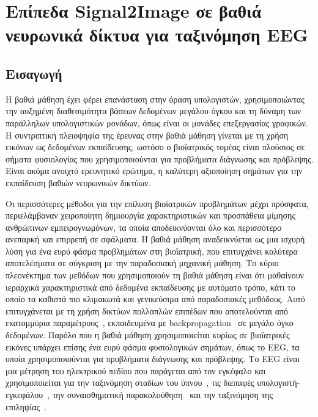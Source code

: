 \chapter{Επίπεδα Signal2Image σε βαθιά νευρωνικά δίκτυα για ταξινόμηση EEG}
\label{chapter5}
\graphicspath{{./images/signal2image-modules-in-deep-neural-networkds-for-eeg-classification/}}

\section{Εισαγωγή}
Η βαθιά μάθηση έχει φέρει επανάσταση στην όραση υπολογιστών, χρησιμοποιώντας την αυξημένη διαθεσιμότητα βάσεων δεδομένων μεγάλου όγκου και τη δύναμη των παράλληλων υπολογιστικών μονάδων, όπως είναι οι μονάδες επεξεργασίας γραφικών.
Η συντριπτική πλειοψηφία της έρευνας στην βαθιά μάθηση γίνεται με τη χρήση εικόνων ως δεδομένων εκπαίδευσης, ωστόσο ο βιοϊατρικός τομέας είναι πλούσιος σε σήματα φυσιολογίας που χρησιμοποιούνται για προβλήματα διάγνωσης και πρόβλεψης.
Είναι ακόμα ανοιχτό ερευνητικό ερώτημα, η καλύτερη αξιοποίηση σημάτων για την εκπαίδευση βαθιών νευρωνικών δικτύων.

Οι περισσότερες μέθοδοι για την επίλυση βιοϊατρικών προβλημάτων μέχρι πρόσφατα, περιελάμβαναν χειροποίητη δημιουργία χαρακτηριστικών και προσπάθεια μίμησης ανθρώπινων εμπειρογνωμόνων, τα οποία αποδεικνύονται όλο και περισσότερο ανεπαρκή και επιρρεπή σε σφάλματα.
Η βαθιά μάθηση αναδεικνύεται ως μια ισχυρή λύση για ένα ευρύ φάσμα προβλημάτων στη βιοϊατρική, που επιτυγχάνει καλύτερα αποτελέσματα σε σύγκριση με την παραδοσιακή μηχανική μάθηση.
Το κύριο πλεονέκτημα των μεθόδων που χρησιμοποιούν τη βαθιά μάθηση είναι ότι μαθαίνουν ιεραρχικά χαρακτηριστικά από δεδομένα εκπαίδευσης με αυτόματο τρόπο, κάτι το οποίο τα καθιστά πιο κλιμακωτά και γενικεύσιμα από παραδοσιακές μεθόδους.
Αυτό επιτυγχάνεται με τη χρήση δικτύων πολλαπλών επιπέδων που αποτελούνται από εκατομμύρια παραμέτρους~\cite{krizhevsky2012imagenet}, εκπαιδευμένα με backpropagation~\cite{rumelhart1986learning} σε μεγάλο όγκο δεδομένων.
Παρόλο που η βαθιά μάθηση χρησιμοποιείται κυρίως σε βιοϊατρικές εικόνες υπάρχει επίσης ένα ευρύ φάσμα φυσιολογικών σημάτων, όπως το EEG, τα οποία χρησιμοποιούνται για προβλήματα διάγνωσης και πρόβλεψης.
Το EEG είναι μια μέτρηση του ηλεκτρικού πεδίου που παράγεται από τον εγκέφαλο και χρησιμοποιείται για την ταξινόμηση σταδίων του ύπνου~\cite{aboalayon2016sleep}, τις διεπαφές υπολογιστή-εγκεφάλου~\cite{al2017review}, την συναισθηματική παρακολούθηση~\cite{lotte1999electroencephalography} και την ταξινόμηση της επιληψίας~\cite{acharya2013automated}.

